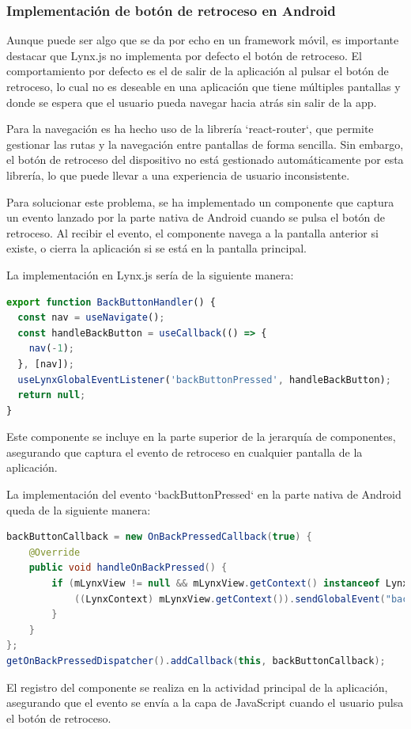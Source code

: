 \subsubsection{Implementación de botón de retroceso en Android}
Aunque puede ser algo que se da por echo en un framework móvil, es importante destacar que Lynx.js no implementa por defecto el botón de retroceso.
El comportamiento por defecto es el de salir de la aplicación al pulsar el botón de retroceso, lo cual no es deseable en una aplicación que tiene múltiples pantallas y donde se espera que el usuario pueda navegar hacia atrás sin salir de la app.

Para la navegación es ha hecho uso de la librería `react-router`, que permite gestionar las rutas y la navegación entre pantallas de forma sencilla.
Sin embargo, el botón de retroceso del dispositivo no está gestionado automáticamente por esta librería, lo que puede llevar a una experiencia de usuario inconsistente.

Para solucionar este problema, se ha implementado un componente que captura un evento lanzado por la parte nativa de Android cuando se pulsa el botón de retroceso.
Al recibir el evento, el componente navega a la pantalla anterior si existe, o cierra la aplicación si se está en la pantalla principal.

La implementación en Lynx.js sería de la siguiente manera:
\begin{lstlisting}[language=typescript, caption={Implementación del botón de retroceso en Lynx.js}]
export function BackButtonHandler() {
  const nav = useNavigate();
  const handleBackButton = useCallback(() => {
    nav(-1);
  }, [nav]);
  useLynxGlobalEventListener('backButtonPressed', handleBackButton);
  return null;
}
\end{lstlisting}
Este componente se incluye en la parte superior de la jerarquía de componentes, asegurando que captura el evento de retroceso en cualquier pantalla de la aplicación.

La implementación del evento `backButtonPressed` en la parte nativa de Android queda de la siguiente manera:
\begin{lstlisting}[language=Java, caption={Implementación del evento de botón de retroceso en Android}]
backButtonCallback = new OnBackPressedCallback(true) {
    @Override
    public void handleOnBackPressed() {
        if (mLynxView != null && mLynxView.getContext() instanceof LynxContext) {
            ((LynxContext) mLynxView.getContext()).sendGlobalEvent("backButtonPressed", null);
        }
    }
};
getOnBackPressedDispatcher().addCallback(this, backButtonCallback);
\end{lstlisting}
El registro del componente se realiza en la actividad principal de la aplicación, asegurando que el evento se envía a la capa de JavaScript cuando el usuario pulsa el botón de retroceso.

